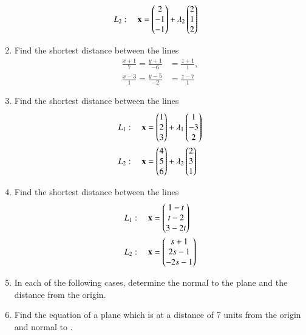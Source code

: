 \begin{enumerate}[label=\arabic*.,ref=\thesubsection.\theenumi]
\begin{align}
\\
L_2: \quad \mathbf{x} &= \begin{pmatrix}2\\-1\\-1\end{pmatrix} + \lambda_2\begin{pmatrix}2 \\ 1 \\2\end{pmatrix}
\end{align}
\item Find the shortest distance between the lines 
\begin{align}
\frac{x+1}{7} = \frac{y+1}{-6} &= \frac{z+1}{1}, 
\\
\frac{x-3}{1} = \frac{y-5}{-2} &= \frac{z-7}{1} 
\end{align}
%
\item Find the shortest distance between the lines 
\begin{align}
L_1: \quad \mathbf{x} &= \begin{pmatrix}1\\2\\3\end{pmatrix} + \lambda_1\begin{pmatrix}1 \\ -3 \\2\end{pmatrix}
\\
L_2: \quad \mathbf{x} &= \begin{pmatrix}4\\5\\6\end{pmatrix} + \lambda_2\begin{pmatrix}2 \\ 3 \\1\end{pmatrix}
\end{align}
%
\item Find the shortest distance between the lines 
\begin{align}
L_1: \quad \mathbf{x} &= \begin{pmatrix}1-t\\t-2\\3-2t\end{pmatrix} 
\\
L_2: \quad \mathbf{x} &= \begin{pmatrix}s+1\\2s-1\\-2s-1\end{pmatrix}
\end{align}
\item In each of the following cases, determine the normal to the plane and the distance from the origin.
\begin{enumerate}[itemsep=2pt]
\end{enumerate}
\item Find the equation of a plane which is at a distance of 7 units from the origin and normal to .

\end{enumerate}
